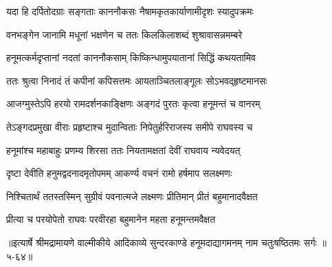 \twolineshloka
{यदा हि दर्पितोदग्राः सङ्गताः काननौकसः}
{नैषामकृतकार्याणामीदृशः स्यादुपक्रमः} %

\twolineshloka
{वनभङ्गेन जानामि मधूनां भक्षणेन च}
{ततः किलकिलाशब्दं शुश्रावासन्नमम्बरे} %

\twolineshloka
{हनूमत्कर्मदृप्तानां नदतां काननौकसाम्}
{किष्किन्धामुपयातानां सिद्धिं कथयतामिव} %

\twolineshloka
{ततः श्रुत्वा निनादं तं कपीनां कपिसत्तमः}
{आयताञ्चितलाङ्गूलः सोऽभवद्हृष्टमानसः} %

\twolineshloka
{आजग्मुस्तेऽपि हरयो रामदर्शनकाङ्क्षिणः}
{अङ्गदं पुरतः कृत्वा हनूमन्तं च वानरम्} %

\twolineshloka
{तेऽङ्गदप्रमुखा वीराः प्रहृष्टाश्च मुदान्विताः}
{निपेतुर्हरिराजस्य समीपे राघवस्य च} %

\twolineshloka
{हनूमांश्च महाबाहुः प्रणम्य शिरसा ततः}
{नियतामक्षतां देवीं राघवाय न्यवेदयत्} %

\twolineshloka
{दृष्टा देवीति हनुमद्वदनादमृतोपमम्}
{आकर्ण्य वचनं रामो हर्षमाप सलक्ष्मणः} %

\twolineshloka
{निश्चितार्थं ततस्तस्मिन् सुग्रीवं पवनात्मजे}
{लक्ष्मणः प्रीतिमान् प्रीतं बहुमानादवैक्षत} %

\twolineshloka
{प्रीत्या च परयोपेतो राघवः परवीरहा}
{बहुमानेन महता हनूमन्तमवैक्षत} %


॥इत्यार्षे श्रीमद्रामायणे वाल्मीकीये आदिकाव्ये सुन्दरकाण्डे हनूमदाद्यागमनम् नाम चतुःषष्ठितमः सर्गः ॥५-६४॥
